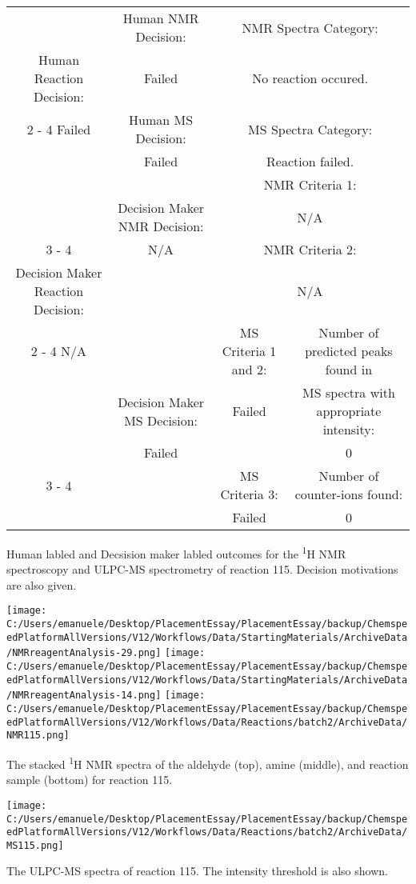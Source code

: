 \documentclass{article}%
\begin{document}
\begin{Decision Table}[H]%
\begin{tabular}{|c|c|c|c|}%
\hline%
&Human NMR Decision:&\multicolumn{2}{|c|}{NMR Spectra Category:}\\%
Human Reaction Decision:&Failed&\multicolumn{2}{|c|}{No reaction occured.}\\%
\cline{2%
-%
4}%
Failed&Human MS Decision:&\multicolumn{2}{|c|}{MS Spectra Category:}\\%
&Failed&\multicolumn{2}{|c|}{Reaction failed.}\\%
\hline%
&&\multicolumn{2}{|c|}{NMR Criteria 1:}\\%
&Decision Maker NMR Decision:&\multicolumn{2}{|c|}{N/A}\\%
\cline{3%
-%
4}%
&N/A&\multicolumn{2}{|c|}{NMR Criteria 2:}\\%
Decision Maker Reaction Decision:&&\multicolumn{2}{|c|}{N/A}\\%
\cline{2%
-%
4}%
N/A&&MS Criteria 1 and 2:&Number of predicted peaks found in\\%
&Decision Maker MS Decision:&Failed&MS spectra with appropriate intensity:\\%
&Failed&&0\\%
\cline{3%
-%
4}%
&&MS Criteria 3:&Number of counter{-}ions found:\\%
&&Failed&0\\%
\hline%
\end{tabular}%
\caption{Human labled and Decsision maker labled outcomes for the \textsuperscript{1}H NMR spectroscopy and ULPC-MS spectrometry of reaction 115. Decision motivations are also given.}%
\end{Decision Table}%
\begin{NMR Spectra}[H]%
\begin{center}%
\texttt{[image: C:/Users/emanuele/Desktop/PlacementEssay/PlacementEssay/backup/ChemspeedPlatformAllVersions/V12/Workflows/Data/StartingMaterials/ArchiveData/NMRreagentAnalysis-29.png]}\hfill%
\texttt{[image: C:/Users/emanuele/Desktop/PlacementEssay/PlacementEssay/backup/ChemspeedPlatformAllVersions/V12/Workflows/Data/StartingMaterials/ArchiveData/NMRreagentAnalysis-14.png]}\hfill%
\texttt{[image: C:/Users/emanuele/Desktop/PlacementEssay/PlacementEssay/backup/ChemspeedPlatformAllVersions/V12/Workflows/Data/Reactions/batch2/ArchiveData/NMR115.png]}\hfill%
\end{center}%
\caption{The stacked \textsuperscript{1}H NMR spectra of the aldehyde (top), amine (middle), and reaction sample (bottom) for reaction 115.}%
\end{NMR Spectra}%
\begin{MS Spectra}[H]%
\begin{center}%
\texttt{[image: C:/Users/emanuele/Desktop/PlacementEssay/PlacementEssay/backup/ChemspeedPlatformAllVersions/V12/Workflows/Data/Reactions/batch2/ArchiveData/MS115.png]}\hfill%
\end{center}%
\caption{The ULPC-MS spectra of reaction 115. The intensity threshold is also shown.}%
\end{MS Spectra}%
\end{document}
